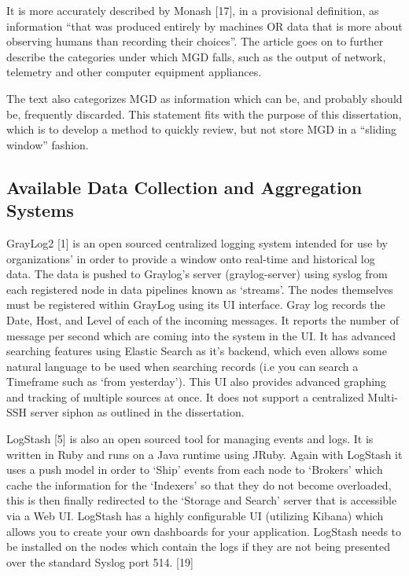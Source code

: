 \documentclass{llncs}
\begin{document}
It is more accurately described by Monash [17], in a provisional definition, as information “that was produced entirely by machines OR data that is more about observing humans than recording their choices”. The article goes on to further describe the categories under which MGD falls, such as the output of network, telemetry and other computer equipment appliances.

The text also categorizes MGD as information which can be, and probably should be, frequently discarded. This statement fits with the purpose of this dissertation, which is to develop a method to quickly review, but not store MGD in a “sliding window” fashion.
%
\subsection{Available Data Collection and Aggregation Systems}
GrayLog2 [1] is an open sourced centralized logging system intended for use by organizations’ in order to provide a window onto real-time and historical log data. The data is pushed to Graylog’s server (graylog-server) using syslog from each registered node in data pipelines known as ‘streams’. The nodes themselves must be registered within GrayLog using its UI interface. Gray log records the Date, Host, and Level of each of the incoming messages. It reports the number of message per second which are coming into the system in the UI. It has advanced searching features using Elastic Search as it’s backend, which even allows some natural language to be used when searching records (i.e you can search a Timeframe such as ‘from yesterday’). This UI also provides advanced graphing and tracking of multiple sources at once. It does not support a centralized Multi-SSH server siphon as outlined in the dissertation.

LogStash [5] is also an open sourced tool for managing events and logs. It is written in Ruby and runs on a Java runtime using JRuby. Again with LogStash it uses a push model in order to ‘Ship’ events from each node to ‘Brokers’ which cache the information for the ‘Indexers’ so that they do not become overloaded, this is then finally redirected to the ‘Storage and Search’ server that is accessible via a Web UI. LogStash has a highly configurable UI (utilizing Kibana) which allows you to create your own dashboards for your application. LogStash needs to be installed on the nodes which contain the logs if they are not being presented over the standard Syslog port 514. [19]
\end{document}
